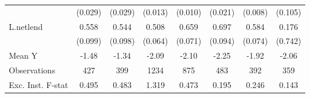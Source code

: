 {\begin{tabular}{l*{7}{c}}
            &     (0.029)         &     (0.029)         &     (0.013)         &     (0.010)         &     (0.021)         &     (0.008)         &     (0.105)         \\
\addlinespace
L.netlend   &       0.558\sym{***}&       0.544\sym{***}&       0.508\sym{***}&       0.659\sym{***}&       0.697\sym{***}&       0.584\sym{***}&       0.176         \\
            &     (0.099)         &     (0.098)         &     (0.064)         &     (0.071)         &     (0.094)         &     (0.074)         &     (0.742)         \\
\midrule
Mean Y      &       -1.48         &       -1.34         &       -2.09         &       -2.10         &       -2.25         &       -1.92         &       -2.06         \\
Observations&         427         &         399         &        1234         &         875         &         483         &         392         &         359         \\
Exc. Inst. F-stat&       0.495         &       0.483         &       1.319         &       0.473         &       0.195         &       0.246         &       0.143         \\
\bottomrule
\end{tabular}
}
